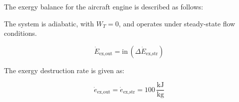 The exergy balance for the aircraft engine is described as follows:  

The system is adiabatic, with \( W_T = 0 \), and operates under steady-state flow conditions.  

\[
\dot{E}_{\text{ex,out}} = \text{in} \, (\Delta \dot{E}_{\text{ex,str}})
\]

The exergy destruction rate is given as:  

\[
\dot{e}_{\text{ex,out}} = \dot{e}_{\text{ex,str}} = 100 \, \frac{\text{kJ}}{\text{kg}}
\]